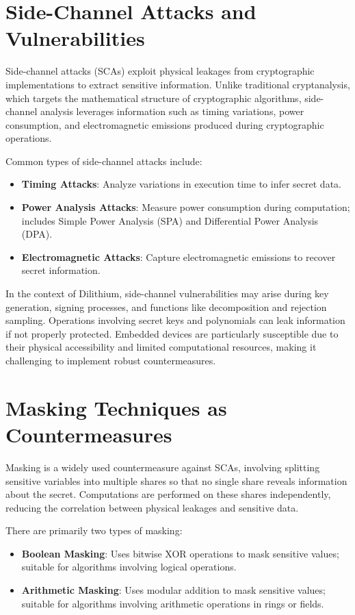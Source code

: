 \section{Side-Channel Attacks and Vulnerabilities}

Side-channel attacks (\acp{SCA}) exploit physical leakages from cryptographic implementations to extract sensitive information. Unlike traditional cryptanalysis, which targets the mathematical structure of cryptographic algorithms, side-channel analysis leverages information such as timing variations, power consumption, and electromagnetic emissions produced during cryptographic operations.

Common types of side-channel attacks include:

\begin{itemize}
    \item \textbf{Timing Attacks}: Analyze variations in execution time to infer secret data.
    \item \textbf{Power Analysis Attacks}: Measure power consumption during computation; includes Simple Power Analysis (SPA) and Differential Power Analysis (DPA).
    \item \textbf{Electromagnetic Attacks}: Capture electromagnetic emissions to recover secret information.
\end{itemize}

In the context of Dilithium, side-channel vulnerabilities may arise during key generation, signing processes, and functions like decomposition and rejection sampling. Operations involving secret keys and polynomials can leak information if not properly protected. Embedded devices are particularly susceptible due to their physical accessibility and limited computational resources, making it challenging to implement robust countermeasures.

\section{Masking Techniques as Countermeasures}

Masking is a widely used countermeasure against \acp{SCA}, involving splitting sensitive variables into multiple shares so that no single share reveals information about the secret. Computations are performed on these shares independently, reducing the correlation between physical leakages and sensitive data.

There are primarily two types of masking:

\begin{itemize}
    \item \textbf{Boolean Masking}: Uses bitwise XOR operations to mask sensitive values; suitable for algorithms involving logical operations.
    \item \textbf{Arithmetic Masking}: Uses modular addition to mask sensitive values; suitable for algorithms involving arithmetic operations in rings or fields.
\end{itemize}

